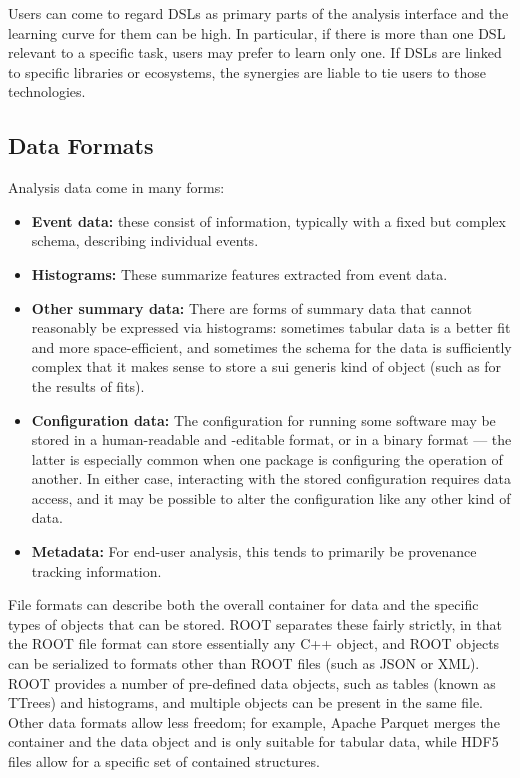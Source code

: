 Users can come to regard DSLs as primary parts of the analysis interface and the learning curve for them can be high. In particular, if there is more than one DSL relevant to a specific task, users may prefer to learn only one. If DSLs are linked to specific libraries or ecosystems, the synergies are liable to tie users to those technologies. 

\subsection{Data Formats}
Analysis data come in many forms:
\begin{itemize}
\item \textbf{Event data:} these consist of information, typically with a fixed but complex schema, describing individual events.
\item \textbf{Histograms:} These summarize features extracted from event data.
\item \textbf{Other summary data:} There are forms of summary data that cannot reasonably be expressed via histograms: sometimes tabular data is a better fit and more space-efficient, and sometimes the schema for the data is sufficiently complex that it makes sense to store a sui generis kind of object (such as for the results of fits).
\item \textbf{Configuration data:} The configuration for running some software may be stored in a human-readable and -editable format, or in a binary format --- the latter is especially common when one package is configuring the operation of another. In either case, interacting with the stored configuration requires data access, and it may be possible to alter the configuration like any other kind of data. 
\item \textbf{Metadata:} For end-user analysis, this tends to primarily be provenance tracking information.
\end{itemize}

File formats can describe both the overall container for data and the specific types of objects that can be stored. ROOT separates these fairly strictly, in that the ROOT file format can store essentially any C++ object, and ROOT objects can be serialized to formats other than ROOT files (such as JSON or XML). ROOT provides a number of pre-defined data objects, such as tables (known as TTrees) and histograms, and multiple objects can be present in the same file. Other data formats allow less freedom; for example, Apache Parquet merges the container and the data object and is only suitable for tabular data, while HDF5 files allow for a specific set of contained structures.

